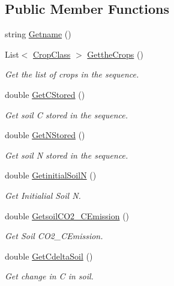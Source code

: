 \subsection*{Public Member Functions}
\begin{DoxyCompactItemize}
\item 
string \mbox{\hyperlink{class_crop_sequence_class_a30d688c391ca01b201e2bc79fa76335b}{Getname}} ()
\item 
List$<$ \mbox{\hyperlink{class_crop_class}{Crop\+Class}} $>$ \mbox{\hyperlink{class_crop_sequence_class_a63762c38c16e0b0ebbf680ad1cf841d3}{Getthe\+Crops}} ()
\begin{DoxyCompactList}\small\item\em Get the list of crops in the sequence. \end{DoxyCompactList}\item 
double \mbox{\hyperlink{class_crop_sequence_class_a63cacd0e3943bbd08128560ccd116b5d}{Get\+C\+Stored}} ()
\begin{DoxyCompactList}\small\item\em Get soil C stored in the sequence. \end{DoxyCompactList}\item 
double \mbox{\hyperlink{class_crop_sequence_class_ad9a5c0b00669854a028bdf5e683c4e17}{Get\+N\+Stored}} ()
\begin{DoxyCompactList}\small\item\em Get soil N stored in the sequence. \end{DoxyCompactList}\item 
double \mbox{\hyperlink{class_crop_sequence_class_a2855cea389afe7a231c99e8dda48bcbe}{Getinitial\+SoilN}} ()
\begin{DoxyCompactList}\small\item\em Get Initialial Soil N. \end{DoxyCompactList}\item 
double \mbox{\hyperlink{class_crop_sequence_class_a4e23005ff8a380dd656fe12571788da2}{Getsoil\+C\+O2\+\_\+\+C\+Emission}} ()
\begin{DoxyCompactList}\small\item\em Get Soil C\+O2\+\_\+\+C\+Emission. \end{DoxyCompactList}\item 
double \mbox{\hyperlink{class_crop_sequence_class_aad00e0d95ab118f4bacec6a9fba51230}{Get\+Cdelta\+Soil}} ()
\begin{DoxyCompactList}\small\item\em Get change in C in soil. \end{DoxyCompactList}\item 

\end{DoxyCompactItemize}
